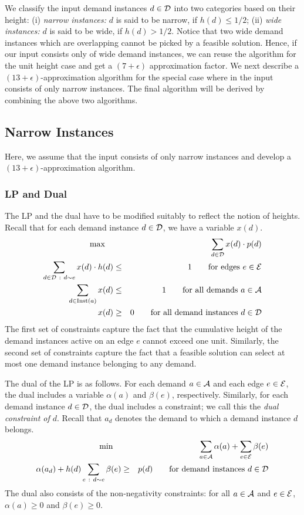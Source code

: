 \documentclass[11pt]{article}
\newcommand{\calA} {{\cal A}}
\newcommand{\calE} {{\cal E}}
\newcommand{\calD} {{\cal D}}
\newcommand{\Inst} {{\rm Inst}}
\begin{document}
We classify the input demand instances $d\in \calD$ into two categories based on their height:
(i) {\em narrow instances: } $d$ is said to be narrow, if $h(d)\leq 1/2$;
(ii) {\em wide instances: } $d$ is said to be wide, if $h(d)>1/2$.
Notice that two wide demand instances which are overlapping cannot be picked by a feasible solution.
Hence, if our input consists only of wide demand instances, we can reuse the algorithm for the unit height case
and get a $(7+\epsilon)$ approximation factor.
We next describe a $(13+\epsilon)$-approximation algorithm for the special case where in the input
consists of only narrow instances. The final algorithm will be derived by combining the above two algorithms.

\subsection{Narrow Instances}
Here, we assume that the input consists of only narrow instances and develop a $(13+\epsilon)$-approximation algorithm.

\subsubsection*{LP and Dual}
The LP and the dual have to be modified suitably to reflect the notion of heights.
Recall that for each demand instance $d\in \calD$, we have a variable $x(d)$.
\begin{eqnarray*}
\max \quad & & \sum_{d \in {\calD}} x(d) \cdot p(d) \\
\sum_{d\in \calD ~:~ d \sim  e} x(d) \cdot h(d)& \leq & 1 \quad \quad \mbox{for edges $e\in \calE$} \\
\sum_{d \in \Inst(a)} x(d) & \leq & 1 \quad \quad \mbox{for all demands $a\in \calA$} \\
x(d) & \geq & 0 \quad \quad \mbox{for all demand instances $d\in \calD$}
\end{eqnarray*}
The first set of constraints capture the fact that the cumulative height of the demand instances
active on an edge $e$ cannot exceed one unit.
Similarly, the second set of constraints capture the fact that a feasible solution
can select at most one demand instance belonging to any demand.

The dual of the LP is as follows.
For each demand $a\in \calA$ and each edge $e\in \calE$, the dual includes a variable $\alpha(a)$ and $\beta(e)$,
respectively. Similarly, for each demand instance $d\in \calD$, 
the dual includes a constraint; we call this the {\em dual constraint of $d$}.
Recall that $a_d$ denotes the demand to which a demand instance $d$ belongs.
\begin{eqnarray}
\nonumber
\min \quad & & \sum_{a \in {\calA}} \alpha(a) + \sum_{e\in \calE} \beta(e) \\
\nonumber
\alpha(a_d) + h(d) \sum_{e~:~ d \sim  e} \beta(e) & \geq & p(d) \quad \quad \mbox{for demand instances $d\in \calD$} 
\end{eqnarray}
The dual also consists of the non-negativity constraints: for all $a\in \calA$ and $e\in \calE$, $\alpha(a)\geq 0$
and $\beta(e)\geq 0$. 
\end{document}
